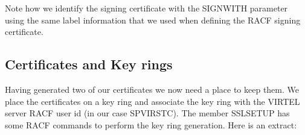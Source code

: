 \documentclass[letterpaper,10pt,english]{sphinxmanual}
\begin{document}
\begin{sphinxVerbatim}[commandchars=\\\{\}]
      
 
 
  
 
 
 
 
 
  
\end{sphinxVerbatim}

\sphinxAtStartPar
Note how we identify the signing certificate with the SIGNWITH parameter using the same label information that we used when defining the RACF signing certificate.

\ignorespaces 

\subsection{Certificates and Key rings}
\label{\detokenize{Customization:certificates-and-key-rings}}\label{\detokenize{Customization:index-108}}
\sphinxAtStartPar
Having generated two of our certificates we now need a place to keep them. We place the certificates on a key ring and associate the key ring with the VIRTEL server RACF user id (in our case SPVIRSTC). The member SSLSETUP has some RACF commands to perform the key ring generation. Here is an extract:
\end{document}
